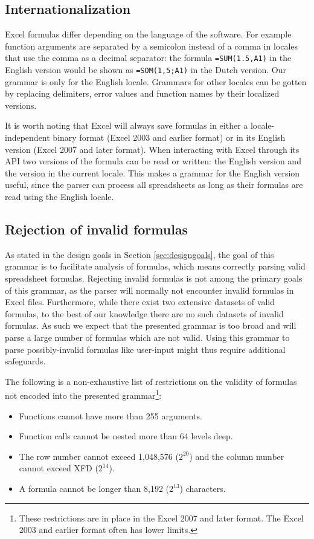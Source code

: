 \documentclass[conference]{IEEEtran}
\begin{document}
\subsection{Internationalization}

Excel formulas differ depending on the language of the software. For example function arguments are separated by a semicolon instead of a comma in locales that use the comma as a decimal separator: the formula \texttt{=SUM(1.5,A1)} in the English version would be shown as \texttt{=SOM(1,5;A1)} in the Dutch version.
Our grammar is only for the English locale.
Grammars for other locales can be gotten by replacing delimiters, error values and function names by their localized versions.

It is worth noting that Excel will always save formulas in either a locale-independent binary format (Excel 2003 and earlier format) or in its English version (Excel 2007 and later format). When interacting with Excel through its API two versions of the formula can be read or written: the English version and the version in the current locale.
This makes a grammar for the English version useful, since the parser can process all spreadsheets as long as their formulas are read using the English locale.

\subsection{Rejection of invalid formulas}

As stated in the design goals in Section \ref{sec:designgoals}, the goal of this grammar is to facilitate analysis of formulas, which means correctly parsing valid spreadsheet formulas.
Rejecting invalid formulas is not among the primary goals of this grammar, as the parser will normally not encounter invalid formulas in Excel files.
Furthermore, while there exist two extensive datasets of valid formulas, to the best of our knowledge there are no such datasets of invalid formulas.
As such we expect that the presented grammar is too broad and will parse a large number of formulas which are not valid.
Using this grammar to parse possibly-invalid formulas like user-input might thus require additional safeguards.

The following is a non-exhaustive list of restrictions on the validity of formulas not encoded into the presented grammar\footnote{These restrictions are in place in the Excel 2007 and later format. The Excel 2003 and earlier format often has lower limits.}:
\begin{itemize}
	\item Functions cannot have more than 255 arguments.
	\item Function calls cannot be nested more than 64 levels deep.
	\item The row number cannot exceed 1,048,576 ($2^{20}$) and the column number cannot exceed XFD ($2^{14}$).
	\item A formula cannot be longer than 8,192 ($2^{13}$) characters.
\end{itemize}
\end{document}
